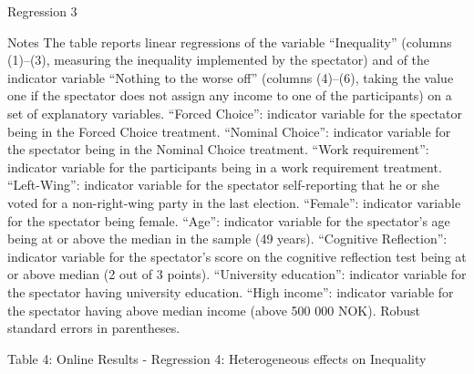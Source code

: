 \documentclass{beamer}
\begin{document}
\begin{frame}{Regression 3}

	\begin{block}{Notes}{\tiny
The table reports linear regressions of the variable “Inequality” (columns (1)–(3),
measuring the inequality implemented by the spectator) and of the indicator variable “Nothing
to the worse off” (columns (4)–(6), taking the value one if the spectator does not assign
any income to one of the participants) on a set of explanatory variables. “Forced
Choice”: indicator variable for the spectator being in the Forced Choice treatment. “Nominal
Choice”: indicator variable for the spectator being in the Nominal Choice treatment.
“Work requirement”: indicator variable for the participants being in a work requirement
treatment. “Left-Wing”: indicator variable for the spectator self-reporting that he or she
voted for a non-right-wing party in the last election. “Female”: indicator variable for the
spectator being female. “Age”: indicator variable for the spectator’s age being at or above
the median in the sample (49 years). “Cognitive Reflection”: indicator variable for the spectator’s
score on the cognitive reflection test being at or above median (2 out of 3 points).
“University education”: indicator variable for the spectator having university education.
“High income”: indicator variable for the spectator having above median income (above
500 000 NOK). Robust standard errors in parentheses.
} %
	\end{block}
\end{frame}

\begin{frame}{Table 4: Online Results -  Regression 4: Heterogeneous effects on Inequality}{\tiny
		
	}  %
\end{frame}
\end{document}
